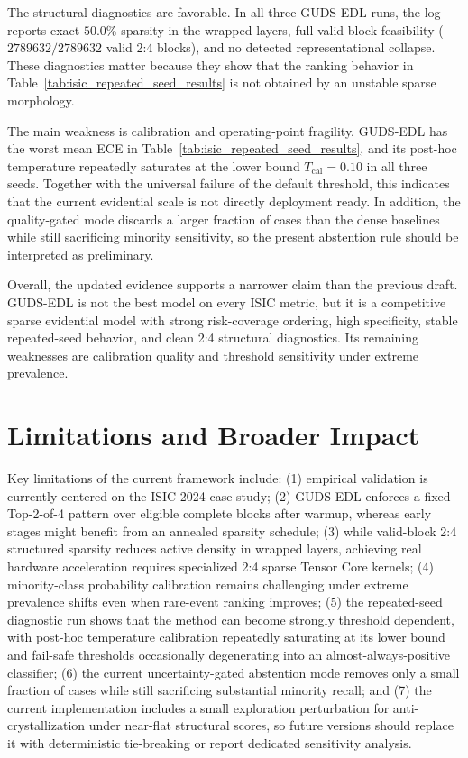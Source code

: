 \documentclass[letterpaper]{article} %
\begin{document}
The structural diagnostics are favorable. In all three GUDS-EDL runs, the log reports exact $50.0\%$ sparsity in the wrapped layers, full valid-block feasibility ($2789632/2789632$ valid 2:4 blocks), and no detected representational collapse. These diagnostics matter because they show that the ranking behavior in Table~\ref{tab:isic_repeated_seed_results} is not obtained by an unstable sparse morphology.

The main weakness is calibration and operating-point fragility. GUDS-EDL has the worst mean ECE in Table~\ref{tab:isic_repeated_seed_results}, and its post-hoc temperature repeatedly saturates at the lower bound $T_{\mathrm{cal}}=0.10$ in all three seeds. Together with the universal failure of the default threshold, this indicates that the current evidential scale is not directly deployment ready. In addition, the quality-gated mode discards a larger fraction of cases than the dense baselines while still sacrificing minority sensitivity, so the present abstention rule should be interpreted as preliminary.

Overall, the updated evidence supports a narrower claim than the previous draft. GUDS-EDL is not the best model on every ISIC metric, but it is a competitive sparse evidential model with strong risk-coverage ordering, high specificity, stable repeated-seed behavior, and clean 2:4 structural diagnostics. Its remaining weaknesses are calibration quality and threshold sensitivity under extreme prevalence.

\section{Limitations and Broader Impact}\label{sec:limitations}
Key limitations of the current framework include: (1) empirical validation is currently centered on the ISIC 2024 case study; (2) GUDS-EDL enforces a fixed Top-2-of-4 pattern over eligible complete blocks after warmup, whereas early stages might benefit from an annealed sparsity schedule; (3) while valid-block 2:4 structured sparsity reduces active density in wrapped layers, achieving real hardware acceleration requires specialized 2:4 sparse Tensor Core kernels; (4) minority-class probability calibration remains challenging under extreme prevalence shifts even when rare-event ranking improves; (5) the repeated-seed diagnostic run shows that the method can become strongly threshold dependent, with post-hoc temperature calibration repeatedly saturating at its lower bound and fail-safe thresholds occasionally degenerating into an almost-always-positive classifier; (6) the current uncertainty-gated abstention mode removes only a small fraction of cases while still sacrificing substantial minority recall; and (7) the current implementation includes a small exploration perturbation for anti-crystallization under near-flat structural scores, so future versions should replace it with deterministic tie-breaking or report dedicated sensitivity analysis.
\end{document}
